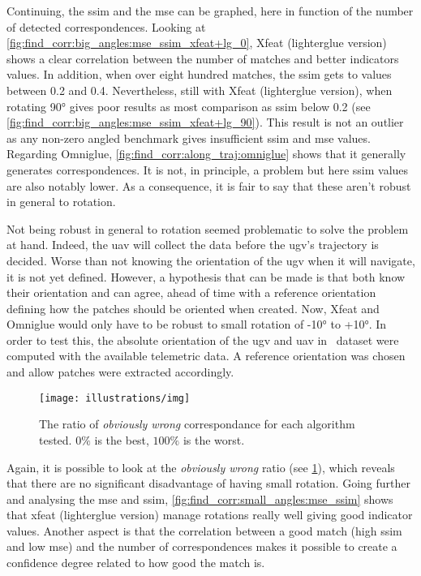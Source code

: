Continuing, the \gls{ssim} and the \gls{mse} can be graphed, here in function of the number of detected correspondences.
Looking at \cref{fig:find_corr:big_angles:mse_ssim_xfeat+lg_0}, Xfeat (lighterglue version) shows a clear correlation between
the number of matches and better indicators values.
In addition, when over eight hundred matches, the \gls{ssim} gets to values between 0.2 and 0.4.
Nevertheless, still with Xfeat (lighterglue version), when rotating 90° gives poor results as most comparison as \gls{ssim} below 0.2 (see \cref{fig:find_corr:big_angles:mse_ssim_xfeat+lg_90}).
This result is not an outlier as any non-zero angled benchmark gives insufficient \gls{ssim} and \gls{mse} values.
Regarding Omniglue, \cref{fig:find_corr:along_traj:omniglue} shows that it generally generates correspondences.
It is not, in principle, a problem but here \gls{ssim} values are also notably lower.
As a consequence, it is fair to say that these aren't robust in general to rotation.


Not being robust in general to rotation seemed problematic to solve the problem at hand.
Indeed, the \gls{uav} will collect the data before the \gls{ugv}'s trajectory is decided.
Worse than not knowing the orientation of the \gls{ugv} when it will navigate, it is not yet defined.
However, a hypothesis that can be made is that both know their orientation and can agree, ahead of time with a reference
orientation defining how the patches should be oriented when created.
Now, Xfeat and Omniglue would only have to be robust to small rotation of -10° to +10°.
In order to test this, the absolute orientation of the \gls{ugv} and \gls{uav} in~\cite{fortin_uav-assisted_2024} dataset
were computed with the available telemetric data.
A reference orientation was chosen and allow patches were extracted accordingly.

\begin{figure}[ht!]
    \centering
    \texttt{[image: illustrations/img]}
    \caption{The ratio of \textit{obviously wrong} correspondance for each algorithm tested.
        $0\%$ is the best, $100\%$ is the worst.}
    \label{fig:find_corr:small_angles:obviously_wrong}
\end{figure}

Again, it is possible to look at the \textit{obviously wrong} ratio (see \cref{fig:find_corr:small_angles:obviously_wrong}),
which reveals that there are no significant disadvantage of having small rotation.
Going further and analysing the \gls{mse} and \gls{ssim}, \cref{fig:find_corr:small_angles:mse_ssim} shows that xfeat (lighterglue version)
manage rotations really well giving good indicator values.
Another aspect is that the correlation between a good match (high \gls{ssim} and low \gls{mse}) and the number of correspondences
makes it possible to create a confidence degree related to how good the match is.

